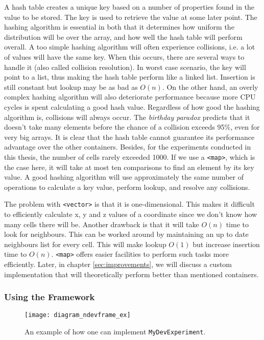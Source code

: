 A hash table creates a unique key based on a number of properties found in the value to be stored. The key is used to retrieve the value at some later point. The hashing algorithm is essential in both that it determines how uniform the distribution will be over the array, and how well the hash table will perform overall. A too simple hashing algorithm will often experience collisions, i.e. a lot of values will have the same key. When this occurs, there are several ways to handle it (also called collision resolution). In worst case scenario, the key will point to a list, thus making the hash table perform like a linked list. Insertion is still constant but lookup may be as bad as $O(n)$. On the other hand, an overly complex hashing algorithm will also deteriorate performance because more CPU cycles is spent calculating a good hash value. Regardless of how good the hashing algorithm is, collisions will always occur. The \emph{birthday paradox} predicts that it doesn't take many elements before the chance of a collision exceeds 95\%, even for very big arrays. It is clear that the hash table cannot guarantee its performance advantage over the other containers. Besides, for the experiments conducted in this thesis, the number of cells rarely exceeded 1000. If we use a \texttt{<map>}, which is the case here, it will take at most ten comparisons to find an element by its key value. A good hashing algorithm will use approximately the same number of operations to calculate a key value, perform lookup, and resolve any collisions.

The problem with \texttt{<vector>} is that it is one-dimensional. This makes it difficult to efficiently calculate x, y and z values of a coordinate since we don't know how many cells there will be. Another drawback is that it will take $O(n)$ time to look for neighbours. This can be worked around by maintaining an up to date neighbours list for every cell. This will make lookup $O(1)$ but increase insertion time to $O(n)$. \texttt{<map>} offers easier facilities to perform such tasks more efficiently. Later, in chapter \ref{sec:improvements}, we will discuss a custom implementation that will theoretically perform better than mentioned containers.


\subsubsection{Using the Framework}
\begin{figure}[!ht]
	\centering
	\texttt{[image: diagram\_ndevframe\_ex]}
	\caption{An example of how one can implement \texttt{MyDevExperiment}.}
	\label{fig:diagram_ndevframe_ex}
\end{figure}

